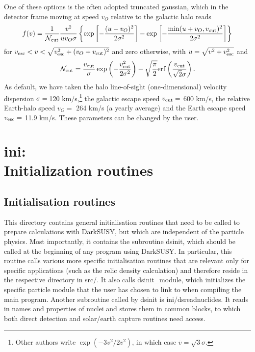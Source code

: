 \documentclass[a4paper,10pt,oneside]{book}
\newcommand{\code}[1]{\ft{#1}}
\newcommand{\codeb}[1]{\ftb{#1}}
\newcommand{\ds}{{\sffamily DarkSUSY}}
\newcommand{\ft}[1]{\textsf{#1}}
\newcommand{\ftb}[1]{{\bfseries \sffamily #1}}
\begin{document}
One of these options is the often adopted truncated gaussian, which in the detector frame 
moving at
speed $v_O$ relative to the galactic halo reads
\begin{equation}
   f(v) = {1\over {\mathcal N}_{\rm cut}} { v^2 \over u v_O \sigma} \left\{
   \exp\left[{-{(u-v_O)^2\over2\sigma^2}}\right] -
   \exp\left[{-{\min(u+v_O,v_{\rm cut})^2\over2\sigma^2}}\right]
   \right\}
\end{equation}
for $ v_{\rm esc} < v < \sqrt{v_{\rm esc}^2 + (v_O + v_{\rm cut} ) ^2
} $ and zero otherwise, with $ u = \sqrt{v^2 + v_{\rm esc}^2} $ and
\begin{equation}
   {\mathcal N}_{\rm cut} =
   {v_{\rm cut}\over\sigma} \exp\left( {-{v_{\rm cut}^2\over2\sigma^2}} \right)
   -
   \sqrt{\pi\over2} {\rm erf} \left( {v_{\rm cut}\over\sqrt{2}\sigma} \right) .
\end{equation}
As default, we have taken the halo line-of-sight (one-dimensional) velocity
dispersion $\sigma = $120 km/s,\footnote{Other authors write
   $\exp(-3v^2/2\overline{v}^2)$, in which case $\overline{v} = \sqrt{3}
   \sigma$.}  the galactic escape speed $ v_{\rm cut} = $ 600 km/s, the relative
Earth-halo speed $ v_O = $ 264 km/s (a yearly average) and the Earth escape
speed $ v_{\rm esc} = $ 11.9 km/s. These parameters can be changed by
the user. 



\chapter[ini: Initialization routines]{\codeb{ini}:\\ Initialization routines}
\label{ch:src/ini}

\section{Initialisation routines}

This directory contains general initialisation routines that need to be called to prepare calculations with 
\ds, but which are independent of the particle physics. Most importantly, it contains the
subroutine \code{dsinit}, which should be called at the beginning of any program using
\ds. In particular, this routine calls various more specific initialisation routines that are relevant
only for specific applications (such as the relic density calculation) and therefore reside
in the respective directory in \code{src/}. It also calls \code{dsinit\_module}, which initializes
the specific particle module that the user has chosen to link to when compiling the main program.
Another subroutine called by \code{dsinit} is \code{ini/dsreadnuclides}. It reads in names and properties 
of nuclei and stores them in common blocks, to which both direct detection and solar/earth capture
routines need access.
\end{document}
